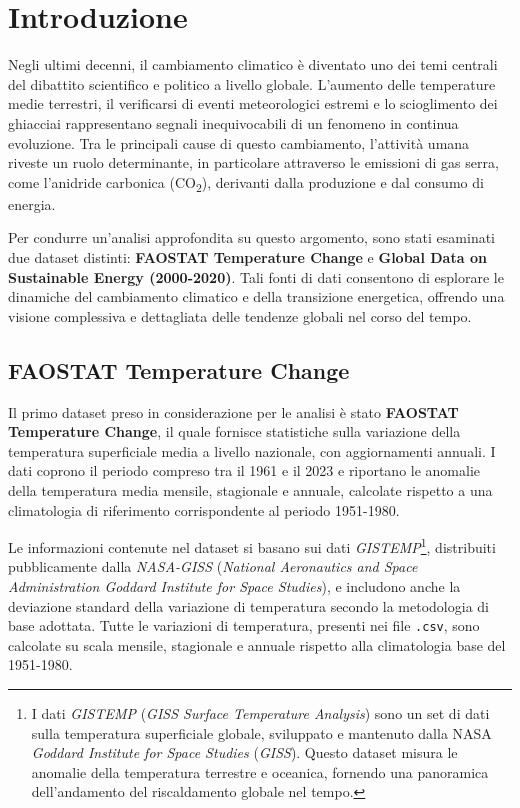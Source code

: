 
\chapter{Introduzione}
Negli ultimi decenni, il cambiamento climatico è diventato uno dei temi centrali del dibattito scientifico e politico a livello globale. L'aumento delle temperature medie terrestri, il verificarsi di eventi meteorologici estremi e lo scioglimento dei ghiacciai rappresentano segnali inequivocabili di un fenomeno in continua evoluzione. Tra le principali cause di questo cambiamento, l'attività umana riveste un ruolo determinante, in particolare attraverso le emissioni di gas serra, come l'anidride carbonica (CO\textsubscript{2}), derivanti dalla produzione e dal consumo di energia.

Per condurre un'analisi approfondita su questo argomento, sono stati esaminati due dataset distinti: \textbf{FAOSTAT Temperature Change} e \textbf{Global Data on Sustainable Energy (2000-2020)}. Tali fonti di dati consentono di esplorare le dinamiche del cambiamento climatico e della transizione energetica, offrendo una visione complessiva e dettagliata delle tendenze globali nel corso del tempo.

\section{FAOSTAT Temperature Change}
Il primo dataset preso in considerazione per le analisi è stato \textbf{FAOSTAT Temperature Change}, il quale fornisce statistiche sulla variazione della temperatura superficiale media a livello nazionale, con aggiornamenti annuali. I dati coprono il periodo compreso tra il 1961 e il 2023 e riportano le anomalie della temperatura media mensile, stagionale e annuale, calcolate rispetto a una climatologia di riferimento corrispondente al periodo 1951-1980.

Le informazioni contenute nel dataset si basano sui dati \textit{GISTEMP}\footnote{I dati \textit{GISTEMP} (\textit{GISS Surface Temperature Analysis}) sono un set di dati sulla temperatura superficiale globale, sviluppato e mantenuto dalla NASA \textit{Goddard Institute for Space Studies} (\textit{GISS}). Questo dataset misura le anomalie della temperatura terrestre e oceanica, fornendo una panoramica dell'andamento del riscaldamento globale nel tempo.}, distribuiti pubblicamente dalla \textit{NASA-GISS} (\textit{National Aeronautics and Space Administration Goddard Institute for Space Studies}), e includono anche la deviazione standard della variazione di temperatura secondo la metodologia di base adottata. Tutte le variazioni di temperatura, presenti nei file \texttt{.csv}, sono calcolate su scala mensile, stagionale e annuale rispetto alla climatologia base del 1951-1980.

